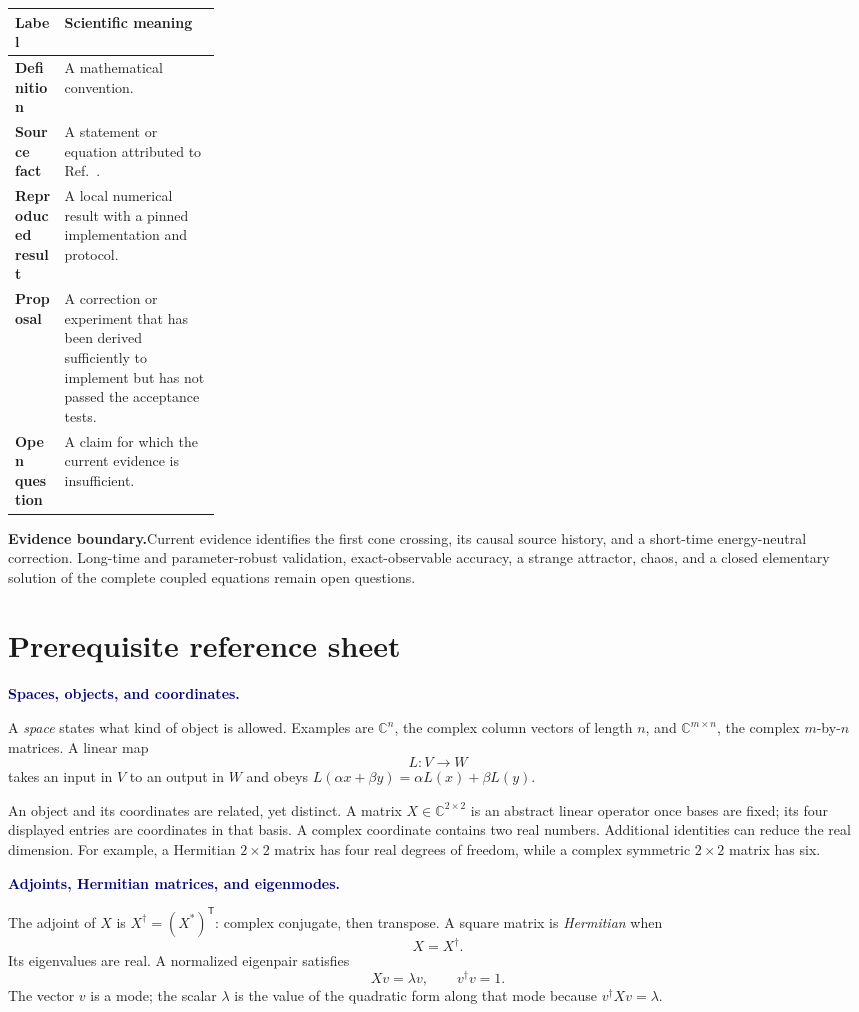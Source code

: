 \documentclass[10pt]{article}
\newcommand{\C}{\mathbb C}
\newcommand{\warningbox}[1]{%
  \par\medskip
  \noindent\colorbox{palered}{%
    \parbox{\dimexpr\linewidth-2\fboxsep\relax}{%
      \textcolor{brick}{\textbf{Evidence boundary.}}\quad #1%
    }%
  }\par\medskip
}
\newcommand{\flowlead}[1]{%
  \par\medskip
  \needspace{3\baselineskip}%
  \noindent\textcolor{navy}{\textbf{#1.}}\enspace\ignorespaces
}
\begin{document}
\begin{tabularx}{\linewidth}{@{}>{\bfseries}p{0.24\linewidth}Y@{}}
\toprule
Label & Scientific meaning \\
\midrule
Definition & A mathematical convention.\\
Source fact & A statement or equation attributed to
Ref.~\cite{riva2026}.\\
Reproduced result & A local numerical result with a pinned implementation and
protocol.\\
Proposal & A correction or experiment that has been derived sufficiently to
implement but has not passed the acceptance tests.\\
Open question & A claim for which the current evidence is insufficient.\\
\bottomrule
\end{tabularx}

\warningbox{Current evidence identifies the first cone crossing, its causal
source history, and a short-time energy-neutral correction.  Long-time and
parameter-robust validation, exact-observable accuracy, a strange attractor,
chaos, and a closed elementary solution of the complete coupled equations
remain open questions.}

\clearpage
\part*{Prerequisite reference sheet}

\flowlead{Spaces, objects, and coordinates}

A \emph{space} states what kind of object is allowed.  Examples are
\(\C^n\), the complex column vectors of length \(n\), and
\(\C^{m\times n}\), the complex \(m\)-by-\(n\) matrices.  A linear map
\[
L:V\longrightarrow W
\]
takes an input in \(V\) to an output in \(W\) and obeys
\(L(\alpha x+\beta y)=\alpha L(x)+\beta L(y)\).

An object and its coordinates are related, yet distinct.  A matrix
\(X\in\C^{2\times2}\) is an abstract linear operator once bases are fixed; its
four displayed entries are coordinates in that basis.  A complex coordinate
contains two real numbers.  Additional identities can reduce the real
dimension.  For example, a Hermitian \(2\times2\) matrix has four real degrees
of freedom, while a complex symmetric \(2\times2\) matrix has six.

\flowlead{Adjoints, Hermitian matrices, and eigenmodes}

The adjoint of \(X\) is \(X^\dagger=(X^\ast)^{\mathsf T}\): complex conjugate,
then transpose.  A square matrix is \emph{Hermitian} when
\[
X=X^\dagger.
\]
Its eigenvalues are real.  A normalized eigenpair satisfies
\[
Xv=\lambda v,\qquad v^\dagger v=1.
\]
The vector \(v\) is a mode; the scalar \(\lambda\) is the value of the
quadratic form along that mode because \(v^\dagger Xv=\lambda\).
\end{document}

